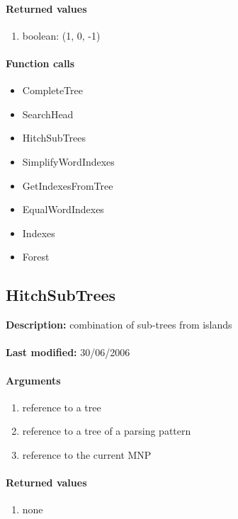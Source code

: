 \paragraph{Returned values}
\begin{enumerate}
\item boolean: (1, 0, -1)
\end{enumerate}

\paragraph{Function calls}
\begin{itemize}
\item CompleteTree
\item SearchHead
\item HitchSubTrees
\item SimplifyWordIndexes
\item GetIndexesFromTree
\item EqualWordIndexes
\item Indexes
\item Forest
\end{itemize}

\subsection{HitchSubTrees}
\textbf{Description:} combination of sub-trees from islands\\
\\\textbf{Last modified:} 30/06/2006

\paragraph{Arguments}
\begin{enumerate}
\item reference to a tree
\item reference to a tree of a parsing pattern
\item reference to the current MNP
\end{enumerate}

\paragraph{Returned values}
\begin{enumerate}
\item none
\end{enumerate}

